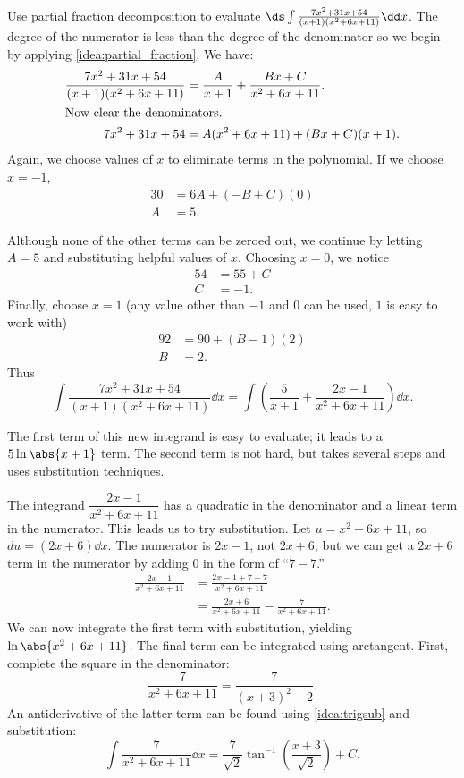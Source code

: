 \begin{example}\label{ex_pf5}
Use partial fraction decomposition to evaluate $\ds \int\frac{7x^2+31x+54}{(x+1)(x^2+6x+11)}\dd x$.
\solution
The degree of the numerator is less than the degree of the denominator so we begin by applying \autoref{idea:partial_fraction}. We have:
\begin{align*}
\frac{7x^2+31x+54}{(x+1)(x^2+6x+11)} &= \frac{A}{x+1} + \frac{Bx+C}{x^2+6x+11}. \\
\intertext{Now clear the denominators.}
7x^2+31x+54 &= A(x^2+6x+11) + (Bx+C)(x+1).
\end{align*}
Again, we choose values of $x$ to eliminate terms in the polynomial.  If we choose $x=-1$,
\begin{align*}
 30&=6A + (-B+C)(0)\\
 A&= 5.
\end{align*}

Although none of the other terms can be zeroed out, we continue by letting $A=5$ and substituting helpful values of $x$. 
Choosing $x=0$, we notice
\begin{align*}
 54&= 55 +C \\
 C&= -1.
\end{align*}
Finally, choose $x=1$ (any value other than $-1$ and $0$ can be used, $1$ is easy to work with)
\begin{align*}
 92&=90 + (B-1)(2)\\
 B&= 2.
\end{align*}
Thus
\[
 \int\frac{7x^2+31x+54}{(x+1)(x^2+6x+11)}\dd x
 = \int\left(\frac{5}{x+1} + \frac{2x-1}{x^2+6x+11}\right)\dd x.
\]

The first term of this new integrand is easy to evaluate; it leads to a $5\ln\abs{x+1}$ term. The second term is not hard, but takes several steps and uses substitution techniques.

The integrand $\dfrac{2x-1}{x^2+6x+11}$ has a quadratic in the denominator and a linear term in the numerator. This leads us to try substitution. Let $u=x^2+6x+11$, so $du=(2x+6)\dd x$. The numerator is $2x-1$, not $2x+6$, but we can get a $2x+6$ term in the numerator by adding 0 in the form of ``$7-7$.''
\begin{align*}
	\frac{2x-1}{x^2+6x+11} &= \frac{2x-1+7-7}{x^2+6x+11} \\
	&= \frac{2x+6}{x^2+6x+11} - \frac{7}{x^2+6x+11}.
\end{align*}
We can now integrate the first term with substitution, yielding $\ln\abs{x^2+6x+11}$. The final term can be integrated using arctangent. First, complete the square in the denominator:
\[\frac{7}{x^2+6x+11} = \frac{7}{(x+3)^2+2}.\]
An antiderivative of the latter term can be found using \autoref{idea:trigsub} and substitution:
\[
 \int \frac7{x^2+6x+11}\dd x=\frac7{\sqrt2}\tan^{-1}\left(\frac{x+3}{\sqrt2}\right)+C.
\]


\end{example}
